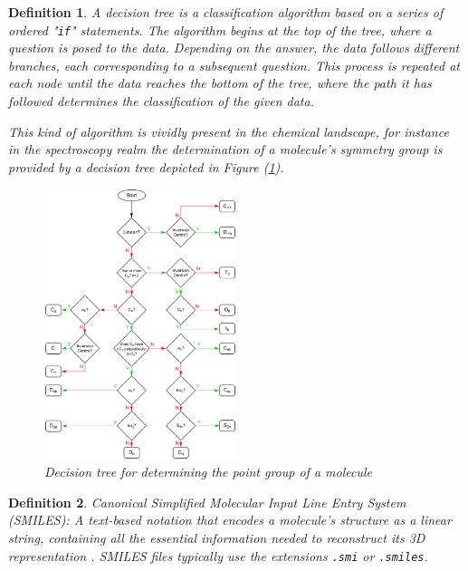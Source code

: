 \documentclass[11pt]{article}
\newtheorem{definition}{Definition}
\begin{document}
\begin{definition}\label{definitionDecisionTree}
A decision tree is a classification algorithm based on a series of ordered "\texttt{if}" statements. The algorithm begins at the top of the tree, where a question is posed to the data. Depending on the answer, the data follows different branches, each corresponding to a subsequent question. This process is repeated at each node until the data reaches the bottom of the tree, where the path it has followed determines the classification of the given data.

This kind of algorithm is vividly present in the chemical landscape, for instance in the spectroscopy realm the determination of a molecule's symmetry group is provided by a decision tree depicted in Figure (\ref{figExScpectroDecisionTree}).
\begin{figure}[H]
\centering
\includegraphics[width = 0.5\textwidth]{GeneralSources/Point_group_determination_flowchart_v2.png}
\caption{Decision tree for determining the point group of a molecule}
\label{figExScpectroDecisionTree}
\end{figure}
\end{definition}

\begin{definition}\label{definitionSMILES}
Canonical Simplified Molecular Input Line Entry System (SMILES): A text-based notation that encodes a molecule’s structure as a linear string, containing all the essential information needed to reconstruct its 3D representation \cite{smiles}. SMILES files typically use the extensions \texttt{.smi} or \texttt{.smiles}.
\end{definition}
\end{document}
